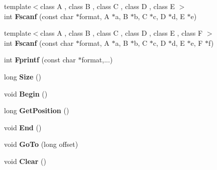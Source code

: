 \begin{DoxyCompactItemize}
\item 
{\footnotesize template$<$class A , class B , class C , class D , class E $>$ }\\int {\bfseries Fscanf} (const char $\ast$format, A $\ast$a, B $\ast$b, C $\ast$c, D $\ast$d, E $\ast$e)\hypertarget{classVSFileSystem_1_1VSFile_a4d7227c8e9378364ee93339a1d8e7dd4}{}\label{classVSFileSystem_1_1VSFile_a4d7227c8e9378364ee93339a1d8e7dd4}

\item 
{\footnotesize template$<$class A , class B , class C , class D , class E , class F $>$ }\\int {\bfseries Fscanf} (const char $\ast$format, A $\ast$a, B $\ast$b, C $\ast$c, D $\ast$d, E $\ast$e, F $\ast$f)\hypertarget{classVSFileSystem_1_1VSFile_a8da43de4050c7c8333c8e416e5777465}{}\label{classVSFileSystem_1_1VSFile_a8da43de4050c7c8333c8e416e5777465}

\item 
int {\bfseries Fprintf} (const char $\ast$format,...)\hypertarget{classVSFileSystem_1_1VSFile_a6906dbf3d2f0471d9115367d118823a0}{}\label{classVSFileSystem_1_1VSFile_a6906dbf3d2f0471d9115367d118823a0}

\item 
long {\bfseries Size} ()\hypertarget{classVSFileSystem_1_1VSFile_aa83ba9bef5f1ba40bbcbf1d409936662}{}\label{classVSFileSystem_1_1VSFile_aa83ba9bef5f1ba40bbcbf1d409936662}

\item 
void {\bfseries Begin} ()\hypertarget{classVSFileSystem_1_1VSFile_a07b4470da75983bf7a796b741fc61a6d}{}\label{classVSFileSystem_1_1VSFile_a07b4470da75983bf7a796b741fc61a6d}

\item 
long {\bfseries Get\+Position} ()\hypertarget{classVSFileSystem_1_1VSFile_a89732e211b0407b5e2580a44f57c6eef}{}\label{classVSFileSystem_1_1VSFile_a89732e211b0407b5e2580a44f57c6eef}

\item 
void {\bfseries End} ()\hypertarget{classVSFileSystem_1_1VSFile_a350e96e46a277169fc5ef0eca4b98b2e}{}\label{classVSFileSystem_1_1VSFile_a350e96e46a277169fc5ef0eca4b98b2e}

\item 
void {\bfseries Go\+To} (long offset)\hypertarget{classVSFileSystem_1_1VSFile_a19ed2b8eb9f88b7190e6e6992d672203}{}\label{classVSFileSystem_1_1VSFile_a19ed2b8eb9f88b7190e6e6992d672203}

\item 
void {\bfseries Clear} ()\hypertarget{classVSFileSystem_1_1VSFile_a9f52da7bfa070c478226c32c1c4bf9be}{}\label{classVSFileSystem_1_1VSFile_a9f52da7bfa070c478226c32c1c4bf9be}


\end{DoxyCompactItemize}
